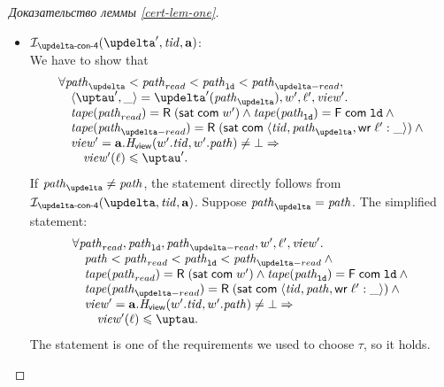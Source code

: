 \begin{proof}[Доказательство леммы \ref{cert-lem-one}]
\begin{itemize}
\begin{itemize}
        \item $\invDeltaDefFour(\delta', \tId, \aT)$: \\
          We have to show that
          \[\begin{array}{l}
      \forall \cpath_{\delta} < \cpath_{read} < \cpath_{\LD} < \cpath_{\delta-read}, \\
\quad \angled{\tau', \_} = \delta'(\cpath_{\delta}), \w', \loc', \R'. \\
\quad \tape(\cpath_{read}) = \tapeRead{(\tapeSatisfied{\Committed}{\w'})} \land \tape(\cpath_{\LD}) = \tapeFence{\Committed}{\LD} \land {} \\
\quad \tape(\cpath_{\delta-read}) = \tapeRead{(\tapeSatisfied{\Committed}{\stRequestWrite{\tId}{\cpath_{\delta}}{\loc'}{\_}})} \land {} \\
\quad \R' = \aT.\rmap(\w'.\tId, \w'.\cpath) \not = \bot \Rightarrow \\
\quad \quad \R'(\loc) \le \tau'. \\
          \end{array}\]
          If $\cpath_{\delta} \not = \cpath$, the statement directly follows from $\invDeltaDefFour(\delta, \tId, \aT)$.
          Suppose $\cpath_{\delta} = \cpath$. The simplified statement:
          \[\begin{array}{l}
      \forall \cpath_{read}, \cpath_{\LD}, \cpath_{\delta-read}, \w', \loc', \R'. \\
\quad \cpath < \cpath_{read} < \cpath_{\LD} < \cpath_{\delta-read} \land {} \\
\quad \tape(\cpath_{read}) = \tapeRead{(\tapeSatisfied{\Committed}{\w'})} \land \tape(\cpath_{\LD}) = \tapeFence{\Committed}{\LD} \land {} \\
\quad \tape(\cpath_{\delta-read}) = \tapeRead{(\tapeSatisfied{\Committed}{\stRequestWrite{\tId}{\cpath}{\loc'}{\_}})} \land {} \\
\quad \R' = \aT.\rmap(\w'.\tId, \w'.\cpath) \not = \bot \Rightarrow \\
\quad \quad \R'(\loc) \le \tau. \\
          \end{array}\]
          The statement is one of the requirements we used to choose $\tau$, so it holds.
      \end{itemize}
  \end{itemize}
\end{proof}



